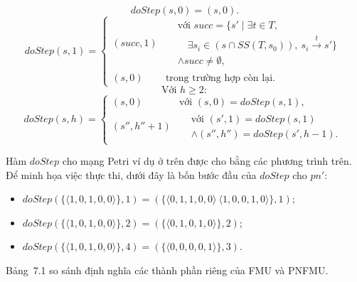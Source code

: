 \begin{equation}
doStep(s,0)=(s,0).\tag{7.14}
\end{equation}
\begin{equation}
doStep(s,1)=\begin{cases}
(succ,1)&\begin{aligned}
&\text{với }succ=\{s'\mid\exists t\in T,\\
&\quad\exists s_i\in(s\cap SS(T,s_0)),\ s_i\xrightarrow{t}s'\}\\
&\land succ\neq\emptyset,
\end{aligned}\\[1ex]
(s,0)&\text{trong trường hợp còn lại.}
\end{cases}\tag{7.15}
\end{equation}
\begin{equation}
\text{Với }h\geq2:\tag{7.16}
\end{equation}
\begin{equation}
doStep(s,h)=\begin{cases}
(s,0)&\text{với }(s,0)=doStep(s,1),\\
(s'',h''+1)&\begin{aligned}
&\text{với }(s',1)=doStep(s,1)\\
&\land(s'',h'')=doStep(s',h-1).
\end{aligned}
\end{cases}\tag{7.17}
\end{equation}

Hàm $doStep$ cho mạng Petri ví dụ ở trên được cho bằng các phương trình trên. Để minh họa việc thực thi, dưới đây là bốn bước đầu của $doStep$ cho $pn'$:
\begin{itemize}
\item $doStep(\{\langle1,0,1,0,0\rangle\},1)=(\{\langle0,1,1,0,0\rangle\ \langle1,0,0,1,0\rangle\},1)$;
\item $doStep(\{\langle1,0,1,0,0\rangle\},2)=(\{\langle0,1,0,1,0\rangle\},2)$;
\item $doStep(\{\langle1,0,1,0,0\rangle\},4)=(\{\langle0,0,0,0,1\rangle\},3)$.
\end{itemize}
Bảng~7.1 so sánh định nghĩa các thành phần riêng của FMU và PNFMU.

